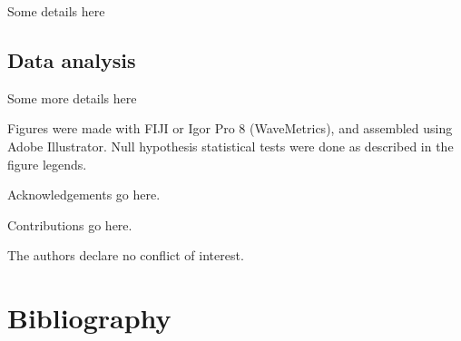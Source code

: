 Some details here

\subsection*{Data analysis}

Some more details here

Figures were made with FIJI or Igor Pro 8 (WaveMetrics), and assembled using Adobe Illustrator.
Null hypothesis statistical tests were done as described in the figure legends.

\begin{acknowledgements}
Acknowledgements go here.
\end{acknowledgements}

\begin{contributions}
Contributions go here.
\end{contributions}

\begin{interests}
The authors declare no conflict of interest.
\end{interests}

\section*{Bibliography}

